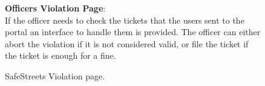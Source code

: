 \begin{figure}
	\begin{flushleft}
		\textbf{Officers Violation Page}:\\
		If the officer needs to check the tickets that the users sent to the portal an interface to handle them is provided. The officer can either abort the violation if it is not considered valid, or file the ticket if the ticket is enough for a fine.
	\end{flushleft}
	\centering
	\caption{SafeStreets Violation page.}
	\label{fig:violation2}
\end{figure}
\clearpage
